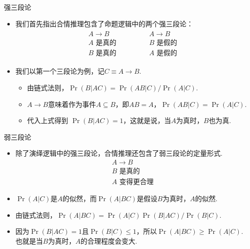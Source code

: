 {强三段论}
\begin{itemize}
    \item 我们首先指出合情推理包含了命题逻辑中的两个强三段论：
        \[
        \begin{array}{c}
            \begin{array}{c}  
                A \to B \\ A\text{ 是真的} \\ \hline B\text{ 是真的}
            \end{array} 
            \qquad \qquad 
            \begin{array}{c}  
                A \to B \\ B\text{ 是假的} \\ \hline A\text{ 是假的}
            \end{array}
        \end{array} 
    \]
    \item 我们以第一个三段论为例，记$C \equiv A \to B$.
    \begin{itemize}
        \item 由链式法则，$\Pr(B|AC) = \Pr(AB|C) / \Pr(A|C)$.
        \item $A \to B$意味着作为事件$A\subseteq B$，即$AB=A$，$\Pr(AB|C) = \Pr(A|C)$.
        \item 代入上式得到 $\Pr(B|AC) = 1$，这就是说，当$A$为真时，$B$也为真.
    \end{itemize}
\end{itemize}


{弱三段论}
\begin{itemize}
    \item 除了演绎逻辑中的强三段论，合情推理还包含了弱三段论的定量形式.
    \[\begin{array}{c}  
            A \to B \\ B\text{ 是真的} \\ \hline A\text{ 变得更合理}
        \end{array}\]
    \item $\Pr(A|C)$是$A$的似然，而$\Pr(A|BC)$是假设$B$为真时，$A$的似然.
    \item 由链式法则，$\Pr(A|BC) = \Pr(A|C)\Pr(B|AC)/\Pr(B|C)$.
    \item 因为$\Pr(B|AC) = 1$且$\Pr(B|C)\leq 1$，所以$\Pr(A|BC) \geq \Pr(A|C)$. 也就是当$B$为真时，$A$的合理程度会变大.
\end{itemize}



